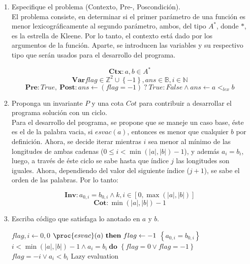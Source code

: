 \documentclass[11pt,spanish]{article}
\newcommand{\tab}[1]{\hspace{.05\textwidth}\rlap{#1}}
\begin{document}
\begin{enumerate}
	\begin{enumerate}
		\item Especifique el problema (Contexto, Pre-, Poscondición). \\
		
		El problema consiste, en determinar si el primer parámetro de una función es menor lexicográficamente al segundo parámetro, ambos, del tipo $A^{*}$, donde $*$, es la estrella de Kleene. Por lo tanto, el contexto está dado por los argumentos de la función. Aparte, se introducen las variables y su respectivo tipo que serán usados para el desarrollo del programa.
		
		$$\textbf{Ctx} : a, b \in A^{*}$$
		$$\textbf{Var} flag \in \mathbb{Z}^2 \cup \left\{-1\right\}, ans \in \mathbb{B}, i \in \mathbb{N}$$
		$$\textbf{Pre} : True,\ \textbf{Post} : ans \gets (flag = -1)\ ?\ True : False \wedge ans \gets a <_{lex} b$$	
		\item Proponga un invariante $P$ y una cota $Cot$ para contribuir a desarrollar el programa solución con un ciclo. \\
		
		Para el desarrollo del programa, se propone que se maneje un caso base, éste es el de la palabra vacia, si $esvac(a)$, entonces es menor que cualquier $b$ por definición. Ahora, se decide iterar mientras $i$ sea menor al mínimo de las longitudes de ambas cadenas ($0 \leq i < \min(\left| a \right|, \left| b \right|) - 1$), y además $a_{i} = b_{i}$, luego, a través de éste ciclo se sabe hasta que índice $j$ las longitudes son iguales. Ahora, dependiendo del valor del siguiente índice ($j + 1$), se sabe el orden de las palabras. Por lo tanto:
		
		$$\textbf{Inv} : a_{0, i} = b_{0, i} \wedge k, i \in \left[0, \max(\left| a \right|, \left| b \right|) \right]$$
		$$\textbf{Cot} : \min(\left| a \right|, \left| b \right|) - 1$$
		
		
		\item Escriba código que satisfaga lo anotado en $a$ y $b$.
		
		\begin{codebox}
  				\li $flag, i \gets 0, 0$
  				\li \If $\proc{esvac}(a)\ \textbf{then}\ flag \gets -1$ 
  				\End
  				\li $\left\{ a_{0, i} = b_{0, i} \right\}$
  				\li \While $i < \min(\left| a \right|, \left| b \right|) - 1 \wedge a_{i} = b_{i}\ \textbf{do}$
  				\li	\tab{$i \gets i + 1$}
  				\li $\left\{ flag = 0 \vee flag = -1 \right\}$
  				\li \Return $flag = -i \vee a_{i} < b_{i}$ \Comment Lazy evaluation
		\end{codebox}
	

\end{enumerate}
\end{enumerate}
\end{document}
